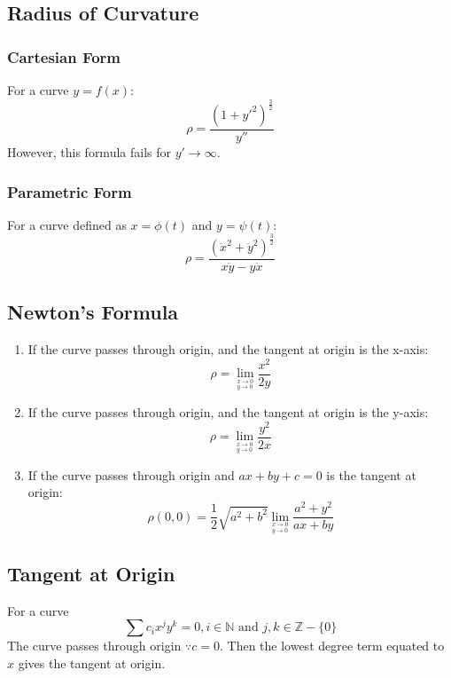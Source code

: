 \subsection{Radius of Curvature}
\subsubsection{Cartesian Form}
For a curve $y=f(x)$:
\begin{equation}
	\rho=\dfrac{(1+y'^2)^{\frac{3}{2}}}{y''}
\end{equation}
However, this formula fails for $y'\to\infty$.
\subsubsection{Parametric Form}
For a curve defined as $x=\phi(t)$ and $y=\psi(t)$:
\begin{equation}
	\rho=\dfrac{(\ddot{x}^2+\ddot{y}^2)^{\frac{3}{2}}}{x\ddot{y}-y\ddot{x}}
\end{equation}

\subsection{Newton's Formula}
\begin{enumerate}
	\item If the curve passes through origin, and the tangent at origin is the x-axis:
	\begin{equation}
		\rho=\lim_{^{x\to0}_{y\to0}} \dfrac{x^2}{2y}
	\end{equation}
	\item If the curve passes through origin, and the tangent at origin is the y-axis:
	\begin{equation}
		\rho=\lim_{^{x\to0}_{y\to0}} \dfrac{y^2}{2x}
	\end{equation}
	\item If the curve passes through origin and $ax+by+c=0$ is the tangent at origin:
	\begin{equation}
		\rho(0,0)=\dfrac{1}{2}\sqrt{a^2+b^2} \lim_{^{x\to0}_{y\to0}} \dfrac{a^2+y^2}{ax+by}
	\end{equation}
\end{enumerate}

\subsection{Tangent at Origin}
For a curve
\begin{equation}
	\sum c_i x^j y^k=0, i\in\mathbb{N}\text{ and }j,k\in\mathbb{Z}-\lbrace 0 \rbrace
\end{equation}
The curve passes through origin $\because c=0$. Then the lowest degree term equated to $x$ gives the tangent at origin.


